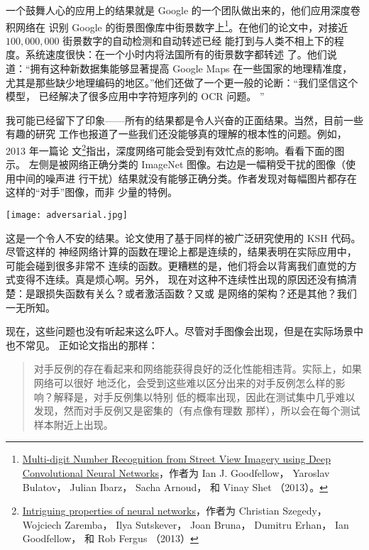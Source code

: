 一个鼓舞人心的应用上的结果就是 Google 的一个团队做出来的，他们应用深度卷积网络在
识别 Google 的街景图像库中街景数字上\footnote{\href{http://arxiv.org/abs/1312.6082}{Multi-digit Number Recognition
  from Street View Imagery using Deep Convolutional Neural Networks}，作者为 Ian
  J. Goodfellow， Yaroslav Bulatov， Julian Ibarz， Sacha Arnoud， 和 Vinay Shet
  （2013）。}。在他们的论文中，对接近 $100,000,000$ 街景数字的自动检测和自动转述已经
能打到与人类不相上下的程度。系统速度很快：在一个小时内将法国所有的街景数字都转述
了。他们说道：“拥有这种新数据集能够显著提高 Google Maps 在一些国家的地理精准度，
尤其是那些缺少地理编码的地区。”他们还做了一个更一般的论断：“我们坚信这个模型，
已经解决了很多应用中字符短序列的 OCR 问题。 ”

我可能已经留下了印象——所有的结果都是令人兴奋的正面结果。当然，目前一些有趣的研究
工作也报道了一些我们还没能够真的理解的根本性的问题。例如，2013 年一篇论
文\footnote{\href{http://arxiv.org/abs/1312.6199}{Intriguing properties of neural networks}，作者为 Christian Szegedy，
  Wojciech Zaremba， Ilya Sutskever， Joan Bruna， Dumitru Erhan， Ian Goodfellow，
  和 Rob Fergus （2013）}指出，深度网络可能会受到有效忙点的影响。看看下面的图示。
左侧是被网络正确分类的 ImageNet 图像。右边是一幅稍受干扰的图像（使用中间的噪声进
行干扰）结果就没有能够正确分类。作者发现对每幅图片都存在这样的“对手”图像，而非
少量的特例。

\begin{center}
  \texttt{[image: adversarial.jpg]}
\end{center}

这是一个令人不安的结果。论文使用了基于同样的被广泛研究使用的 KSH 代码。尽管这样的
神经网络计算的函数在理论上都是连续的，结果表明在实际应用中，可能会碰到很多非常不
连续的函数。更糟糕的是，他们将会以背离我们直觉的方式变得不连续。真是烦心啊。另外，
现在对这种不连续性出现的原因还没有搞清楚：是跟损失函数有关么？或者激活函数？又或
是网络的架构？还是其他？我们一无所知。

现在，这些问题也没有听起来这么吓人。尽管对手图像会出现，但是在实际场景中也不常见。
正如论文指出的那样：

\begin{quote}
  对手反例的存在看起来和网络能获得良好的泛化性能相违背。实际上，如果网络可以很好
  地泛化，会受到这些难以区分出来的对手反例怎么样的影响？解释是，对手反例集以特别
  低的概率出现，因此在测试集中几乎难以发现，然而对手反例又是密集的（有点像有理数
  那样），所以会在每个测试样本附近上出现。
\end{quote}


